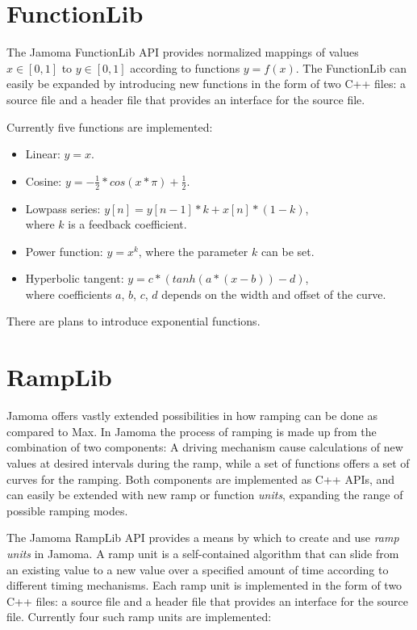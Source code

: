 \documentclass{article}
\begin{document}
\section{FunctionLib}\label{sec:functionlib}

The Jamoma FunctionLib API provides normalized mappings of values $x \in [0,1]$ to $y \in [0,1]$ according to functions $y = f(x)$. The FunctionLib can easily be expanded by introducing new functions in the form of two C++ files: a source file and a header file that provides an interface for the source file.

Currently five functions are implemented: 

\begin{itemize}
	\item Linear: $y = x$.
	\item Cosine: $y = - \frac{1}{2} * cos(x * \pi ) + \frac{1}{2} $.
	\item Lowpass series: $y[n] = y[n-1] * k + x[n] * (1-k)$, \\ where $k$ is a feedback coefficient.
	\item Power function: $ y = x^{k} $, where the parameter $k$ can be set.
	\item Hyperbolic tangent: $ y = c * (tanh(a*(x-b)) - d) $, \\ where coefficients $a$, $b$, $c$, $d$ depends on the width and offset of the curve.
\end{itemize}

There are plans to introduce exponential functions.



\section{RampLib}\label{sec:ramplib}

Jamoma offers vastly extended possibilities in how ramping can be done as compared to Max. In Jamoma the process of ramping is made up from the combination of two components: A driving mechanism cause calculations of new values at desired intervals during the ramp, while a set of functions offers a set of curves for the ramping. Both components are implemented as C++ APIs, and can easily be extended with new ramp or function \emph{units}, expanding the range of possible ramping modes.

The Jamoma RampLib API provides a means by which to create and use \emph{ramp units} in Jamoma.  A ramp unit is a self-contained algorithm that can slide from an existing value to a new value over a specified amount of time according to different timing mechanisms. Each ramp unit is implemented in the form of two C++ files: a source file and a header file that provides an interface for the source file. Currently four such ramp units are implemented:
\end{document}
